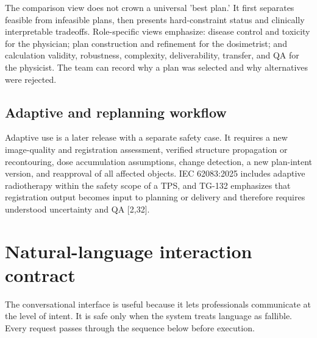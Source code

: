 \documentclass[11pt,letterpaper]{article}
\begin{document}
The comparison view does not crown a universal 'best plan.' It first separates feasible from infeasible plans, then presents hard-constraint status and clinically interpretable tradeoffs. Role-specific views emphasize: disease control and toxicity for the physician; plan construction and refinement for the dosimetrist; and calculation validity, robustness, complexity, deliverability, transfer, and QA for the physicist. The team can record why a plan was selected and why alternatives were rejected.

\subsection{Adaptive and replanning workflow}

Adaptive use is a later release with a separate safety case. It requires a new image-quality and registration assessment, verified structure propagation or recontouring, dose accumulation assumptions, change detection, a new plan-intent version, and reapproval of all affected objects. IEC 62083:2025 includes adaptive radiotherapy within the safety scope of a TPS, and TG-132 emphasizes that registration output becomes input to planning or delivery and therefore requires understood uncertainty and QA [2,32].

\section{Natural-language interaction contract}

The conversational interface is useful because it lets professionals communicate at the level of intent. It is safe only when the system treats language as fallible. Every request passes through the sequence below before execution.
\end{document}
